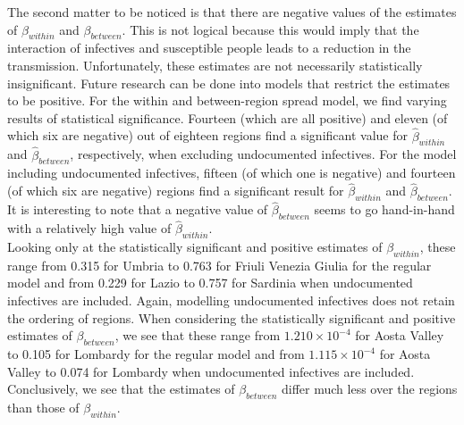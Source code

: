 \documentclass[12pt]{article}
\begin{document}
	The second matter to be noticed is that there are negative values of the estimates of $\beta_{within}$ and $\beta_{between}$. This is not logical because this would imply that the interaction of infectives and susceptible people leads to a reduction in the transmission. Unfortunately, these estimates are not necessarily statistically insignificant. Future research can be done into models that restrict the estimates to be positive. For the within and between-region spread model, we find varying results of statistical significance. Fourteen (which are all positive) and eleven (of which six are negative) out of eighteen regions find a significant value for $\widehat{\beta}_{within}$ and $\widehat{\beta}_{between}$, respectively, when excluding undocumented infectives. For the model including undocumented infectives, fifteen (of which one is negative) and fourteen (of which six are negative) regions find a significant result for $\widehat{\beta}_{within}$ and $\widehat{\beta}_{between}$. It is interesting to note that a negative value of $\widehat{\beta}_{between}$ seems to go hand-in-hand with a relatively high value of $\widehat{\beta}_{within}$.
	\\
	
	
	Looking only at the statistically significant and positive estimates of $\beta_{within}$, these range from 0.315 for Umbria to 0.763 for Friuli Venezia Giulia for the regular model and from 0.229 for Lazio to 0.757 for Sardinia when undocumented infectives are included. Again, modelling undocumented infectives does not retain the ordering of regions. When considering the statistically significant and positive estimates of $\beta_{between}$, we see that these range from $1.210 \times 10^{-4}$ for Aosta Valley to 0.105 for Lombardy for the regular model and from $1.115 \times 10^{-4}$ for Aosta Valley to 0.074 for Lombardy when undocumented infectives are included. Conclusively, we see that the estimates of $\beta_{between}$ differ much less over the regions than those of $\beta_{within}$.
	\\
	
\end{document}
